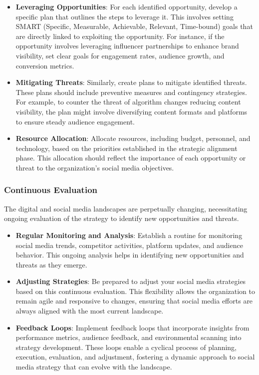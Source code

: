\documentclass[
]{book}
\providecommand{\tightlist}{%
  \setlength{\itemsep}{0pt}\setlength{\parskip}{0pt}}
\begin{document}
\begin{itemize}
\tightlist
\item
  \textbf{Leveraging Opportunities}: For each identified opportunity, develop a specific plan that outlines the steps to leverage it. This involves setting SMART (Specific, Measurable, Achievable, Relevant, Time-bound) goals that are directly linked to exploiting the opportunity. For instance, if the opportunity involves leveraging influencer partnerships to enhance brand visibility, set clear goals for engagement rates, audience growth, and conversion metrics.
\item
  \textbf{Mitigating Threats}: Similarly, create plans to mitigate identified threats. These plans should include preventive measures and contingency strategies. For example, to counter the threat of algorithm changes reducing content visibility, the plan might involve diversifying content formats and platforms to ensure steady audience engagement.
\item
  \textbf{Resource Allocation}: Allocate resources, including budget, personnel, and technology, based on the priorities established in the strategic alignment phase. This allocation should reflect the importance of each opportunity or threat to the organization's social media objectives.
\end{itemize}

\hypertarget{continuous-evaluation}{%
\subsubsection*{Continuous Evaluation}\label{continuous-evaluation}}

The digital and social media landscapes are perpetually changing, necessitating ongoing evaluation of the strategy to identify new opportunities and threats.

\begin{itemize}
\tightlist
\item
  \textbf{Regular Monitoring and Analysis}: Establish a routine for monitoring social media trends, competitor activities, platform updates, and audience behavior. This ongoing analysis helps in identifying new opportunities and threats as they emerge.
\item
  \textbf{Adjusting Strategies}: Be prepared to adjust your social media strategies based on this continuous evaluation. This flexibility allows the organization to remain agile and responsive to changes, ensuring that social media efforts are always aligned with the most current landscape.
\item
  \textbf{Feedback Loops}: Implement feedback loops that incorporate insights from performance metrics, audience feedback, and environmental scanning into strategy development. These loops enable a cyclical process of planning, execution, evaluation, and adjustment, fostering a dynamic approach to social media strategy that can evolve with the landscape.
\end{itemize}
\end{document}
